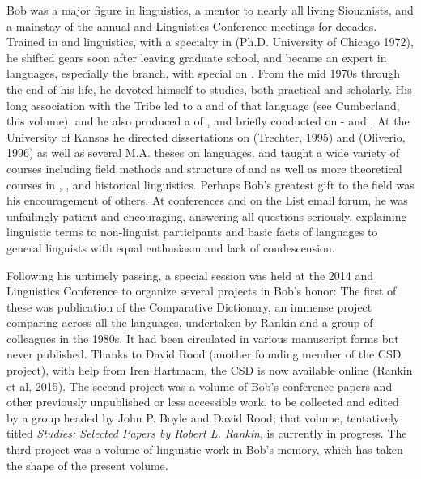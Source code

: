 \begin{refsection}
Bob was a major figure in  linguistics, a mentor to nearly all living Siouanists, and a mainstay of the annual  and  Linguistics Conference meetings for decades. Trained in  and  linguistics, with a specialty in  (Ph.D. University of Chicago 1972), he shifted gears soon after leaving graduate school, and became an expert in  languages, especially the  branch, with special  on . From the mid 1970s through the end of his life, he devoted himself to  studies, both practical and scholarly. His long association with the  Tribe led to a  and  of that language (see Cumberland, this volume), and he also produced a  of , and briefly conducted  on - and . At the University of Kansas he directed dissertations on  (Trechter, 1995) and  (Oliverio, 1996) as well as several M.A. theses on  languages, and taught a wide variety of courses including field methods and structure of  and  as well as more theoretical courses in , , and historical linguistics. Perhaps Bob's greatest gift to the field was his encouragement of others. At conferences and on the  List email forum, he was unfailingly patient and encouraging, answering all questions seriously, explaining linguistic terms to non-linguist participants and basic facts of  languages to general linguists with equal enthusiasm and lack of condescension.

Following his untimely passing, a special session was held at the 2014  and  Linguistics Conference to organize several projects in Bob's honor: The first of these was publication of the Comparative  Dictionary, an immense project comparing  across all the  languages, undertaken by Rankin and a group of colleagues in the 1980s. It had been circulated in various manuscript forms but never published. Thanks to David Rood (another founding member of the CSD project), with help from Iren Hartmann, the CSD is now available online (Rankin et al, 2015). The second project was a volume of Bob's conference papers and other previously unpublished or less accessible work, to be collected and edited by a group headed by John P. Boyle and David Rood; that volume, tentatively titled \textit{ Studies: Selected Papers by Robert L. Rankin}, is currently in progress. The third project was a volume of  linguistic work in Bob's memory, which has taken the shape of the present volume.


\end{refsection}
